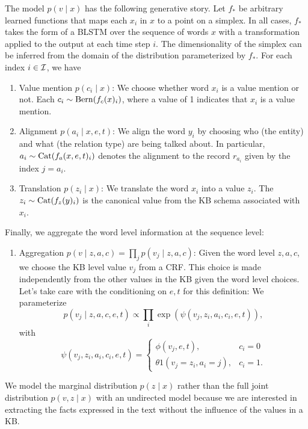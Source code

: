 \documentclass[12pt]{article}
\begin{document}
The model $p(v\mid x)$ has the following generative story.
Let $f_*$ be arbitrary learned functions that maps each $x_i$ in $x$ to
a point on a simplex.
In all cases, $f_*$ takes the form of a BLSTM over the sequence of words $x$
with a transformation applied to the output at each time step $i$.
The dimensionality of the simplex can be inferred from the domain of the
distribution parameterized by $f_*$.
For each index $i \in \mathcal{I}$, we have
\begin{enumerate}
\item Value mention $p(c_i \mid x)$: We choose whether word $x_i$
   is a value mention or not. Each $c_i \sim \mathrm{Bern}(f_c(x)_i)$, where a value of 1 indicates
   that $x_i$ is a value mention.
\item Alignment $p(a_i \mid x,e,t)$: We align the word $y_i$ by choosing who (the entity)
    and what (the relation type) are being talked about.
    In particular, $a_i\sim\mathrm{Cat}(f_a(x,e,t)_i)$ denotes the alignment to the record $r_{a_i}$
    given by the index $j = a_i$. 
\item Translation $p(z_i \mid x)$: We translate the word $x_i$ into a value $z_i$.
    The $z_i \sim \mathrm{Cat}(f_z(y)_i)$ is the canonical value from the KB schema 
    associated with $x_i$.
\end{enumerate}

Finally, we aggregate the word level information at the sequence level:
\begin{enumerate}
\item Aggregation $p(v \mid z,a,c) = \prod_j p(v_j \mid z,a,c)$:
    Given the word level $z,a,c$,
    we choose the KB level value $v_j$ from a CRF.
    This choice is made independently from the other values in the KB
    given the word level choices.
    Let's take care with the conditioning on $e,t$ for this definition:
    We parameterize
    $$p(v_j \mid z,a,c,e,t) \propto \prod_i \exp(\psi(v_j, z_i, a_i, c_i,e,t)),$$
    with
    $$
    \psi(v_j, z_i, a_i, c_i,e,t) = \begin{cases}
    \phi(v_j,e,t), & c_i = 0 \\
    \theta 1(v_j = z_i, a_i = j), & c_i = 1.
    \end{cases}
    $$
\end{enumerate}

We model the marginal distribution $p(z \mid x)$ rather than
the full joint distribution $p(v,z\mid x)$ with an undirected model
because we are interested in extracting the facts expressed in the text
without the influence of the values in a KB.
\end{document}

